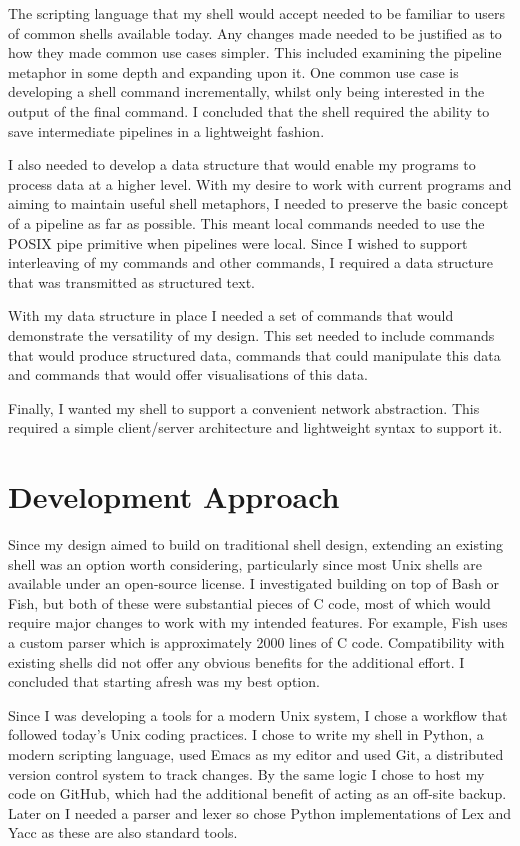 \documentclass[12pt,twoside,notitlepage]{report}
\begin{document}
The scripting language that my shell would accept needed to be
familiar to users of common shells available today. Any changes made
needed to be justified as to how they made common use cases
simpler. This included examining the pipeline metaphor in some depth
and expanding upon it. One common use case is developing a shell
command incrementally, whilst only being interested in the output of
the final command. I concluded that the shell required the ability to
save intermediate pipelines in a lightweight fashion.

I also needed to develop a data structure that would enable my
programs to process data at a higher level. With my desire to work
with current programs and aiming to maintain useful shell metaphors, I
needed to preserve the basic concept of a pipeline as far as
possible. This meant local commands needed to use the POSIX pipe
primitive when pipelines were local. Since I wished to support
interleaving of my commands and other commands, I required a data
structure that was transmitted as structured text.

With my data structure in place I needed a set of commands that would
demonstrate the versatility of my design. This set needed to include commands
that would produce structured data, commands that could manipulate this data and
commands that would offer visualisations of this data.

Finally, I wanted my shell to support a convenient network abstraction. This
required a simple client/server architecture and lightweight syntax to
support it.

\section{Development Approach}
Since my design aimed to build on traditional shell design, extending
an existing shell was an option worth considering, particularly since
most Unix shells are available under an open-source license. I
investigated building on top of Bash or Fish, but both of these were
substantial pieces of C code, most of which would require major
changes to work with my intended features. For example, Fish uses a
custom parser which is approximately 2000 lines of C code. Compatibility
with existing shells did not offer any obvious benefits for the
additional effort. I concluded that starting afresh was my best
option.

Since I was developing a tools for a modern Unix system, I chose a workflow that
followed today's Unix coding practices. I chose to write my shell in Python, a
modern scripting language, used Emacs as my editor and used Git, a distributed
version control system to track changes. By the same logic I chose to host my
code on GitHub, which had the additional benefit of acting as an off-site
backup. Later on I needed a parser and lexer so chose Python implementations of
Lex and Yacc as these are also standard tools.
\end{document}
